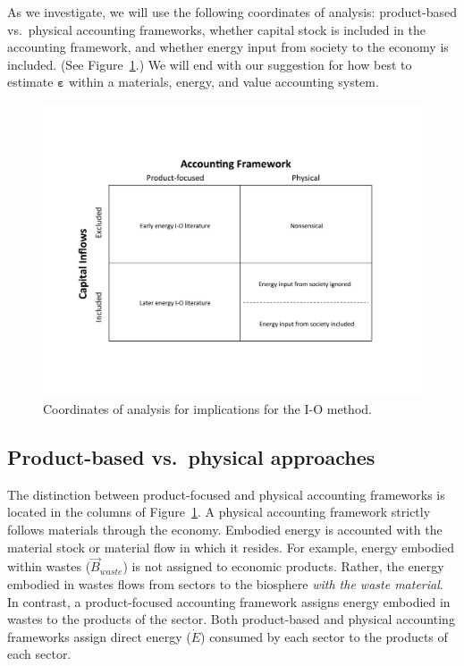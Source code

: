 As we investigate, we will use the following
coordinates of analysis:
product-based vs.\ physical accounting frameworks,
whether capital stock is included in the accounting framework, and
whether energy input from society to the economy is included.
(See Figure~\ref{fig:coords_of_analysis}.)
We will end with our suggestion for how best to estimate
$\boldsymbol{\varepsilon}$ within
a materials, energy, and value accounting system.

\begin{figure}[!ht]
\centering{}
\includegraphics[width=0.8\linewidth]{Part_3/Chapter_Implications/Images/Grid.pdf}
\caption[Coordinates of analysis for implications for the I-O method]{Coordinates of analysis for implications for the I-O method.}
\label{fig:coords_of_analysis}
\end{figure}


\subsection{Product-based vs.\ physical approaches}
\label{sec:prod_vs_physical}

The distinction between product-focused and physical
accounting frameworks is located in the columns
of Figure~\ref{fig:coords_of_analysis}.
A physical accounting framework strictly follows materials 
through the economy. 
Embodied energy is accounted with the material stock or material flow
in which it resides.
For example, energy embodied within wastes ($\vec{B}_{waste}$) 
is not assigned to economic products. 
Rather, the energy embodied in wastes flows from sectors 
to the biosphere \emph{with the waste material}.
In contrast, a product-focused accounting framework assigns 
energy embodied in wastes to the products of the sector.
Both product-based and physical accounting frameworks
assign direct energy ($\dot{E}$) consumed by each sector
to the products of each sector.

